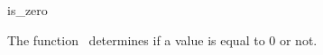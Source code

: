\begin{ccRefFunction}{is_zero}

\ccDefinition

The function \ccRefName\ determines if a value is equal to 0 or not.


{}

\end{ccRefFunction}
